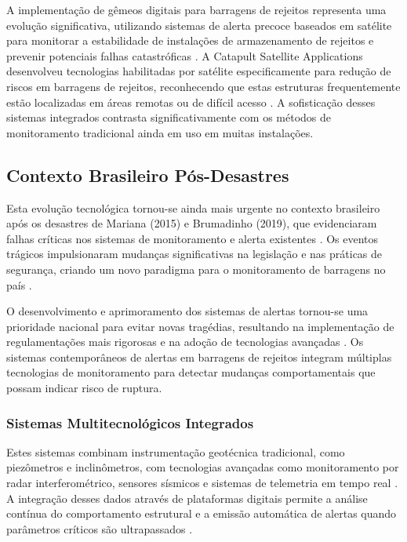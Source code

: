 A implementação de gêmeos digitais para barragens de rejeitos representa uma evolução significativa, utilizando sistemas de alerta precoce baseados em satélite para monitorar a estabilidade de instalações de armazenamento de rejeitos e prevenir potenciais falhas catastróficas \cite{internationalwater2024digital}. A Catapult Satellite Applications desenvolveu tecnologias habilitadas por satélite especificamente para redução de riscos em barragens de rejeitos, reconhecendo que estas estruturas frequentemente estão localizadas em áreas remotas ou de difícil acesso \cite{satellite2023tailings}. A sofisticação desses sistemas integrados contrasta significativamente com os métodos de monitoramento tradicional ainda em uso em muitas instalações.

\subsection{Contexto Brasileiro Pós-Desastres}

Esta evolução tecnológica tornou-se ainda mais urgente no contexto brasileiro após os desastres de Mariana (2015) e Brumadinho (2019), que evidenciaram falhas críticas nos sistemas de monitoramento e alerta existentes \cite{camara2024familias}. Os eventos trágicos impulsionaram mudanças significativas na legislação e nas práticas de segurança, criando um novo paradigma para o monitoramento de barragens no país \cite{brasil2020lei14066}.

O desenvolvimento e aprimoramento dos sistemas de alertas tornou-se uma prioridade nacional para evitar novas tragédias, resultando na implementação de regulamentações mais rigorosas e na adoção de tecnologias avançadas \cite{synergia2024desastres}. Os sistemas contemporâneos de alertas em barragens de rejeitos integram múltiplas tecnologias de monitoramento para detectar mudanças comportamentais que possam indicar risco de ruptura.

\subsubsection{Sistemas Multitecnológicos Integrados}

Estes sistemas combinam instrumentação geotécnica tradicional, como piezômetros e inclinômetros, com tecnologias avançadas como monitoramento por radar interferométrico, sensores sísmicos e sistemas de telemetria em tempo real \cite{trimble2025melhor}. A integração desses dados através de plataformas digitais permite a análise contínua do comportamento estrutural e a emissão automática de alertas quando parâmetros críticos são ultrapassados \cite{bentley2025solucoes}.

